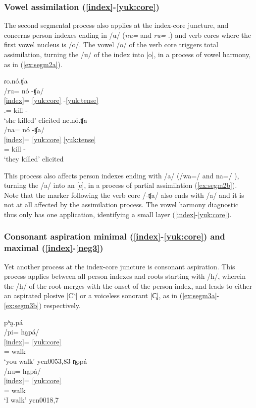 \documentclass[output=paper]{langscibook}
\begin{document}
\subsubsection{Vowel assimilation (\ref{index}-\ref{yuk:core})}
The second segmental process also applies at the index-core juncture, and concerns person indexes ending in /u/ (\textit{nu=} \Fsg{} and \textit{ru=} \Tsg{}.\F{}) and verb cores where the first vowel nucleus is /o/. The vowel /o/ of the verb core triggers total assimilation, turning the /u/ of the index into [o], in a process of vowel harmony, as in (\ref{ex:segm2a}). 


\ea \label{ex:segm2}
\ea \label{ex:segm2a}
ɾo.nó.ʧa  \\
    \glll  /ru= nó -ʧa/ \\
         \ref{index}= \ref{yuk:core} -\ref{yuk:tense} \\
        \Tsg{}.\F{}= kill -\Pst{}\\
    \glt `she killed' \hfill elicited
\ex \label{ex:segm2b}
ne.nó.ʧa  \\
\glll /na= nó -ʧa/\\
      \ref{index}= \ref{yuk:core} \ref{yuk:tense}   \\
        \Tpl{}= kill -\Pst{}\\
    \glt `they killed' \hfill elicited
 \z
 \z

This process also affects person indexes ending with /a/ (/wa=/ \Fpl{} and na=/ \Tpl{}), turning the /a/ into an [e], in a process of partial assimilation (\ref{ex:segm2b}). Note that the marker following the verb core /-ʧa/ also ends with /a/ and it is not at all affected by the assimilation process. The vowel harmony diagnostic thus only has one application, identifying a small layer (\ref{index}-\ref{yuk:core}).

\subsubsection{Consonant aspiration minimal (\ref{index}-\ref{yuk:core}) and maximal (\ref{index}-\ref{neg3})}
Yet another process at the index-core juncture is consonant aspiration. This process applies between all person indexes and roots starting with /h/, wherein the /h/ of the root merges with the onset of the person index, and leads to either an aspirated plosive [Cʰ] or a voiceless sonorant [C̥], as in (\ref{ex:segm3a}-\ref{ex:segm3b}) respectively.

\ea \label{ex:segm3}
\ea \label{ex:segm3a}
pʰa̰.pá \\
\glll   /pi= ha̰pá/ \\
      \ref{index}= \ref{yuk:core}\\
        \Ssg{}= walk\\
    \glt `you walk' \hfill ycn0053,83
\ex \label{ex:segm3b}
n̥o̰pá   \\
    \glll /nu= ha̰pá/ \\
          \ref{index}= \ref{yuk:core} \\
        \Fsg{}= walk\\
    \glt `I walk' \hfill ycn0018,7
 \z
 \z
\end{document}
